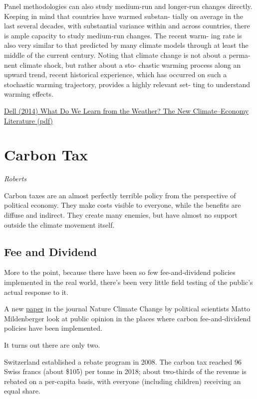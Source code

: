\documentclass[
]{book}
\begin{document}
Panel
methodologies can also study medium-run
and longer-run changes directly. Keeping in
mind that countries have warmed substan-
tially on average in the last several decades,
with substantial variance within and across
countries, there is ample capacity to study
medium-run changes. The recent warm-
ing rate is also very similar to that predicted
by many climate models through at least
the middle of the current century. Noting
that climate change is not about a perma-
nent climate shock, but rather about a sto-
chastic warming process along an upward
trend, recent historical experience, which
has occurred on such a stochastic warming
trajectory, provides a highly relevant set-
ting to understand warming effects.

\href{pdf/Dell_2014\%20_The_New_Climate_Economy_Litterature.pdf}{Dell (2014) What Do We Learn from the Weather? The New Climate--Economy Literature (pdf)}

\hypertarget{carbon-tax}{%
\section{Carbon Tax}\label{carbon-tax}}

\emph{Roberts}

Carbon taxes are an almost perfectly terrible policy from the perspective of political economy. They make costs visible to everyone, while the benefits are diffuse and indirect. They create many enemies, but have almost no support outside the climate movement itself.

\hypertarget{fee-and-dividend}{%
\subsection{Fee and Dividend}\label{fee-and-dividend}}

More to the point, because there have been so few fee-and-dividend policies implemented in the real world, there's been very little field testing of the public's actual response to it.

A new \href{https://www.nature.com/articles/s41558-021-01268-3}{paper} in the journal Nature Climate Change by political scientists Matto Mildenberger look at public opinion in the places where carbon fee-and-dividend policies have been implemented.

It turns out there are only two.

Switzerland established a rebate program in 2008. The carbon tax reached 96 Swiss francs (about \$105) per tonne in 2018; about two-thirds of the revenue is rebated on a per-capita basis, with everyone (including children) receiving an equal share.
\end{document}
